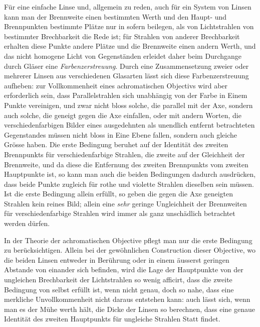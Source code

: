 \documentclass[11pt,a4paper]{article}
\begin{document}
\smallskip
Für eine einfache Linse und, allgemein zu reden, auch für ein System von Linsen kann man der Brennweite einen bestimmten Werth und den Haupt- und Brennpunkten bestimmte Plätze nur in sofern beilegen, als von Lichtstrahlen von bestimmter Brechbarkeit die Rede ist; für Strahlen von anderer Brechbarkeit erhalten diese Punkte andere Plätze und die Brennweite einen andern Werth, und das nicht homogene Licht von Gegenständen erleidet daher beim Durchgange durch Gläser eine \textit{Farbenzerstreuung}. Durch eine Zusammensetzung zweier oder mehrerer Linsen aus verschiedenen Glasarten lässt sich diese Farbenzerstreuung aufheben: zur Vollkommenheit eines achromatischen Objectivs wird aber erforderlich sein, dass Parallelstrahlen sich unabhängig von der Farbe in Einem Punkte vereinigen, und zwar nicht bloss solche, die parallel mit der Axe, sondern auch solche, die geneigt gegen die Axe einfallen, oder mit andern Worten, die verschiedenfarbigen Bilder eines ausgedehnten als unendlich entfernt betrachteten Gegenstandes müssen nicht bloss in Eine Ebene fallen, sondern auch gleiche Grösse haben. Die erste Bedingung beruhet auf der Identität des zweiten Brennpunkts für verschiedenfarbige Strahlen, die zweite auf der Gleichheit der Brennweite, und da diese die Entfernung des zweiten Brennpunkts vom zweiten Hauptpunkte ist, so kann man auch die beiden Bedingungen dadurch ausdrücken, dass beide Punkte zugleich für rothe und violette Strahlen dieselben sein müssen. Ist die erste Bedingung allein erfüllt, so geben die gegen die Axe geneigten Strahlen kein reines Bild; allein eine \textit{sehr} geringe Ungleichheit der Brennweiten für verschiedenfarbige Strahlen wird immer als ganz unschädlich betrachtet werden dürfen.

In der Theorie der achromatischen Objective pflegt man nur die erste Bedingung zu berücksichtigen. Allein bei der gewöhnlichen Construction dieser Objective, wo die beiden Linsen entweder in Berührung oder in einem äusserst geringen Abstande von einander sich befinden, wird die Lage der Hauptpunkte von der ungleichen Brechbarkeit der Lichtstrahlen so wenig afficirt, dass die zweite Bedingung von selbst erfüllt ist, wenn nicht genau, doch so nahe, dass eine merkliche Unvollkommenheit nicht daraus entstehen kann: auch lässt sich, wenn man es der Mühe werth hält, die Dicke der Linsen so berechnen, dass eine genaue Identität des zweiten Hauptpunkts für ungleiche Strahlen Statt findet.
\end{document}
